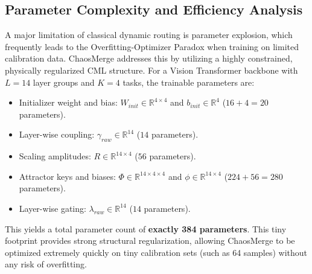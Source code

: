 \subsection{Parameter Complexity and Efficiency Analysis}
A major limitation of classical dynamic routing is parameter explosion, which frequently leads to the Overfitting-Optimizer Paradox when training on limited calibration data. ChaosMerge addresses this by utilizing a highly constrained, physically regularized CML structure. For a Vision Transformer backbone with $L=14$ layer groups and $K=4$ tasks, the trainable parameters are:
\begin{itemize}
    \item Initializer weight and bias: $W_{init} \in \mathbb{R}^{4 \times 4}$ and $b_{init} \in \mathbb{R}^4$ ($16 + 4 = 20$ parameters).
    \item Layer-wise coupling: $\gamma_{raw} \in \mathbb{R}^{14}$ ($14$ parameters).
    \item Scaling amplitudes: $R \in \mathbb{R}^{14 \times 4}$ ($56$ parameters).
    \item Attractor keys and biases: $\Phi \in \mathbb{R}^{14 \times 4 \times 4}$ and $\phi \in \mathbb{R}^{14 \times 4}$ ($224 + 56 = 280$ parameters).
    \item Layer-wise gating: $\lambda_{raw} \in \mathbb{R}^{14}$ ($14$ parameters).
\end{itemize}
This yields a total parameter count of \textbf{exactly 384 parameters}. This tiny footprint provides strong structural regularization, allowing ChaosMerge to be optimized extremely quickly on tiny calibration sets (such as 64 samples) without any risk of overfitting.
